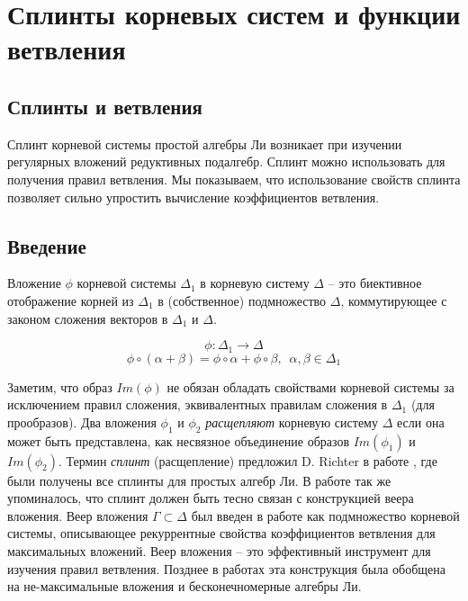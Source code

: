 
\chapter{Сплинты корневых систем и функции ветвления}
\label{cha:splints}


\section{Сплинты и ветвления}
\label{sec:splints}


%

Сплинт корневой системы простой алгебры Ли возникает при изучении регулярных вложений редуктивных подалгебр. Сплинт можно использовать для получения правил ветвления. Мы показываем, что использование свойств сплинта  позволяет сильно упростить вычисление коэффициентов ветвления. 

\section{Введение}
\label{sec:Introduction}

Вложение  $\phi$ корневой системы $\Delta_1$ в корневую систему $\Delta$ -- это биективное отображение корней из $\Delta_{1}$ в (собственное) подмножество $\Delta$, коммутирующее с законом сложения векторов в $\Delta_{1}$ и $\Delta$.

\begin{equation*}
\phi:\Delta_1 \longrightarrow \Delta
\end{equation*}
\begin{equation*}
\phi \circ (\alpha + \beta) =\phi \circ \alpha + \phi \circ \beta,
\,\,\, \alpha,\beta \in \Delta_1
\end{equation*}

Заметим, что образ  $Im(\phi)$ не обязан обладать свойствами корневой системы за исключением правил сложения, эквивалентных правилам сложения в  $\Delta_{1}$ (для прообразов). Два вложения  $\phi_1$ и $\phi_2$  {\it расщепляют} корневую систему  $\Delta$ если она может быть представлена, как несвязное объединение образов $Im(\phi_1)$ и $Im(\phi_2)$.   
Термин {\it сплинт} (расщепление) предложил D. Richter в работе  \cite{richter2008splints}, где  были получены все сплинты для простых алгебр Ли. В работе так же упоминалось, что сплинт должен быть тесно связан с конструкцией веера вложения. Веер вложения  $\Gamma\subset \Delta$ был введен в работе  \cite{lyakhovsky1996rra} как подмножество корневой системы, описывающее рекуррентные свойства коэффициентов ветвления для максимальных вложений. Веер вложения -- это эффективный инструмент для изучения правил ветвления. Позднее в работах \cite{2010arXiv1007.0318L, ilyin812pbc} эта конструкция была обобщена на не-максимальные вложения и бесконечномерные алгебры Ли.

